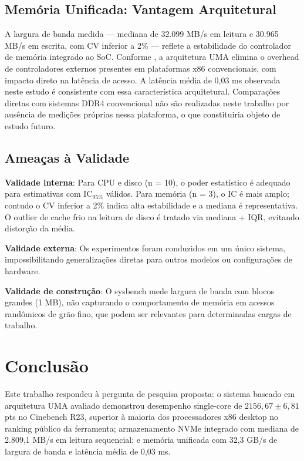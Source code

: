 \documentclass[12pt]{article}
\begin{document}
\subsection{Mem\'oria Unificada: Vantagem Arquitetural}

A largura de banda medida --- mediana de 32.099 MB/s em leitura e 30.965 MB/s
em escrita, com CV inferior a 2\% --- reflete a estabilidade do controlador
de mem\'oria integrado ao SoC. Conforme \cite{lim2022apple}, a arquitetura
UMA elimina o overhead de controladores externos presentes em plataformas x86
convencionais, com impacto direto na lat\^encia de acesso. A lat\^encia
m\'edia de 0,03 ms observada neste estudo \'e consistente com essa
caracter\'istica arquitetural. Compara\c{c}\~oes diretas com sistemas DDR4
convencional n\~ao s\~ao realizadas neste trabalho por aus\^encia de medi\c{c}\~oes
pr\'oprias nessa plataforma, o que constituiria objeto de estudo futuro.

\subsection{Amea\c{c}as \`a Validade}

\textbf{Validade interna}: Para CPU e disco (n = 10), o poder estat\'istico
\'e adequado para estimativas com IC$_{95\%}$ v\'alidos. Para mem\'oria
(n = 3), o IC \'e mais amplo; contudo o CV inferior a 2\% indica alta
estabilidade e a mediana \'e representativa. O outlier de cache frio na
leitura de disco \'e tratado via mediana + IQR, evitando distor\c{c}\~ao
da m\'edia.

\textbf{Validade externa}: Os experimentos foram conduzidos em um \'unico
sistema, impossibilitando generaliza\c{c}\~oes diretas para outros modelos
ou configura\c{c}\~oes de hardware.

\textbf{Validade de constru\c{c}\~ao}: O sysbench mede largura de banda com
blocos grandes (1 MB), n\~ao capturando o comportamento de mem\'oria em
acessos rand\^omicos de gr\~ao fino, que podem ser relevantes para
determinadas cargas de trabalho.


\section{Conclus\~ao}

Este trabalho respondeu \`a pergunta de pesquisa proposta: o sistema baseado
em arquitetura UMA avaliado demonstrou desempenho single-core de
$2156{,}67 \pm 6{,}81$ pts no Cinebench R23, superior \`a maioria dos
processadores x86 desktop no ranking p\'ublico da ferramenta; armazenamento
NVMe integrado com mediana de 2.809,1 MB/s em leitura sequencial; e mem\'oria
unificada com 32,3 GB/s de largura de banda e lat\^encia m\'edia de 0,03 ms.
\end{document}
